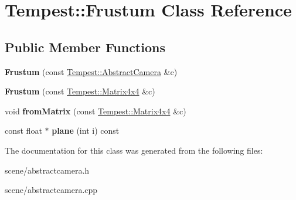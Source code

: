 \hypertarget{class_tempest_1_1_frustum}{\section{Tempest\+:\+:Frustum Class Reference}
\label{class_tempest_1_1_frustum}
}
\subsection*{Public Member Functions}
\begin{DoxyCompactItemize}
\item 
\hypertarget{class_tempest_1_1_frustum_ad54cb208096ce65fe5338574eb2813ec}{{\bfseries Frustum} (const \hyperlink{class_tempest_1_1_abstract_camera}{Tempest\+::\+Abstract\+Camera} \&c)}\label{class_tempest_1_1_frustum_ad54cb208096ce65fe5338574eb2813ec}

\item 
\hypertarget{class_tempest_1_1_frustum_aea2f401b4172b7d52175415de024f5b8}{{\bfseries Frustum} (const \hyperlink{class_tempest_1_1_matrix4x4}{Tempest\+::\+Matrix4x4} \&c)}\label{class_tempest_1_1_frustum_aea2f401b4172b7d52175415de024f5b8}

\item 
\hypertarget{class_tempest_1_1_frustum_a0afe8eb86df4209e9047d3474ad8f874}{void {\bfseries from\+Matrix} (const \hyperlink{class_tempest_1_1_matrix4x4}{Tempest\+::\+Matrix4x4} \&c)}\label{class_tempest_1_1_frustum_a0afe8eb86df4209e9047d3474ad8f874}

\item 
\hypertarget{class_tempest_1_1_frustum_aa040a989012d168bc9eebaf077110ad1}{const float $\ast$ {\bfseries plane} (int i) const }\label{class_tempest_1_1_frustum_aa040a989012d168bc9eebaf077110ad1}

\end{DoxyCompactItemize}


The documentation for this class was generated from the following files\+:\begin{DoxyCompactItemize}
\item 
scene/abstractcamera.\+h\item 
scene/abstractcamera.\+cpp\end{DoxyCompactItemize}
